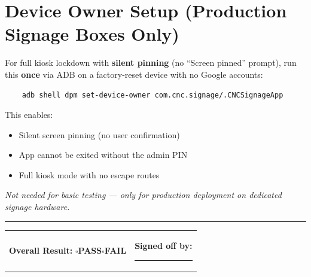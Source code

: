\documentclass[11pt,a4paper]{article}
\newcommand{\checkbox}{$\square$\;}
\newcommand{\pass}{\textcolor{passGreen}{\textbf{PASS}}}
\newcommand{\fail}{\textcolor{failRed}{\textbf{FAIL}}}
\begin{document}
\vspace{1cm}
\section*{Device Owner Setup \textcolor{failRed}{(Production Signage Boxes Only)}}

For full kiosk lockdown with \textbf{silent pinning} (no ``Screen pinned'' prompt), run this \textbf{once} via ADB on a factory-reset device with no Google accounts:

\begin{verbatim}
    adb shell dpm set-device-owner com.cnc.signage/.CNCSignageApp
\end{verbatim}

\noindent This enables:
\begin{itemize}[nosep]
  \item Silent screen pinning (no user confirmation)
  \item App cannot be exited without the admin PIN
  \item Full kiosk mode with no escape routes
\end{itemize}

\vspace{0.5cm}
\noindent\textit{Not needed for basic testing --- only for production deployment on dedicated signage hardware.}

\vspace{1cm}
\noindent\rule{\textwidth}{0.4pt}
\vspace{0.3cm}

\noindent
\begin{tabular}{@{}p{8cm}p{8cm}@{}}
\textbf{Overall Result:} \checkbox \pass \quad \checkbox \fail &
\textbf{Signed off by:} \rule{5cm}{0.4pt} \\
\end{tabular}
\end{document}

